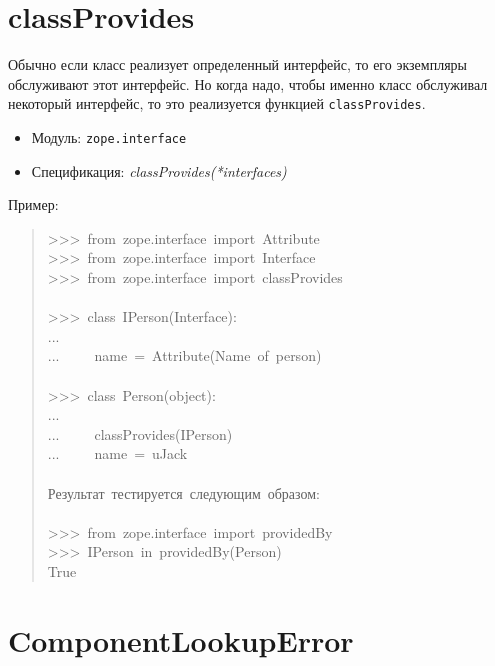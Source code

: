 \documentclass[14pt,a4paper,openany,twoside,final]{extbook}
\providecommand*{\DUroletitlereference}[1]{\textsl{#1}}
\begin{document}
\section*{classProvides%
  \label{classprovides}%
}

Обычно если класс реализует определенный интерфейс, то его экземпляры
обслуживают этот интерфейс.  Но когда надо, чтобы именно класс
обслуживал некоторый интерфейс, то это реализуется функцией
\texttt{classProvides}.

\begin{itemize}

\item Модуль: \texttt{zope.interface}

\item Спецификация: \DUroletitlereference{classProvides(*interfaces)}

\end{itemize}

Пример:

\begin{quote}{\ttfamily \raggedright \noindent
>{}>{}>~from~zope.interface~import~Attribute\\
>{}>{}>~from~zope.interface~import~Interface\\
>{}>{}>~from~zope.interface~import~classProvides\\
~\\
>{}>{}>~class~IPerson(Interface):\\
...\\
...~~~~~name~=~Attribute(\textquotedbl{}Name~of~person\textquotedbl{})\\
~\\
>{}>{}>~class~Person(object):\\
...\\
...~~~~~classProvides(IPerson)\\
...~~~~~name~=~u\textquotedbl{}Jack\textquotedbl{}\\
~\\
Результат~тестируется~следующим~образом:\\
~\\
>{}>{}>~from~zope.interface~import~providedBy\\
>{}>{}>~IPerson~in~providedBy(Person)\\
True
}
\end{quote}


\section*{ComponentLookupError%
  \label{componentlookuperror}%
}
\end{document}
